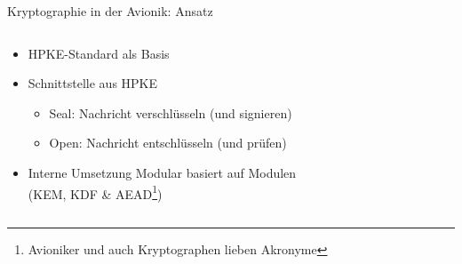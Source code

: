 \begin{frame}[c]{Kryptographie in der Avionik: Ansatz}
  \begin{columns}[fullwidth,c]
    \begin{column}{.65\linewidth}
      \begin{itemize}
        \item HPKE-Standard als Basis

        \item Schnittstelle aus HPKE
        \begin{itemize}
          \item Seal: Nachricht verschlüsseln (und signieren)
          \item Open: Nachricht entschlüsseln (und prüfen)
        \end{itemize}

        \item Interne Umsetzung Modular basiert auf Modulen\\ %
         (KEM, KDF \& AEAD\footnote{Avioniker und auch Kryptographen lieben Akronyme}) %


      \end{itemize}
    \end{column}%
    \begin{column}{.35\linewidth}
      

\end{column}
\end{columns}
\end{frame}
